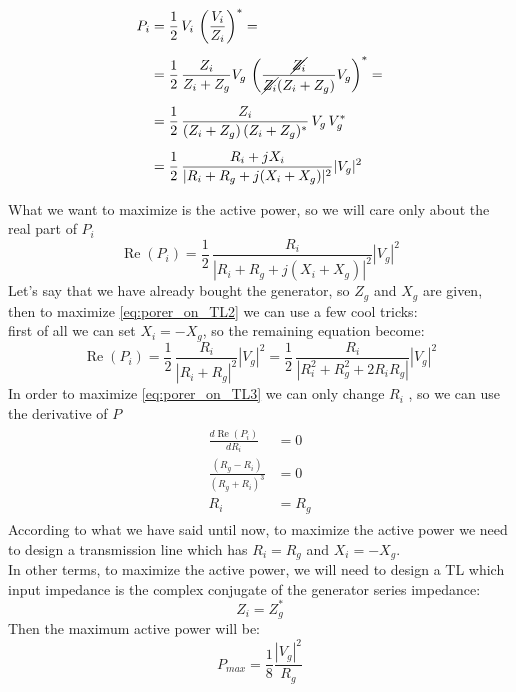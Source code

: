 \begin{align*}
    \begin{split}
        P_i&=\frac{1}{2}\,V_i\,\left(\frac{V_i}{Z_i}\right)^*=\\[5pt]
        &=\frac{1}{2}\,\frac{Z_i}{Z_i+Z_g}V_g\,\left(\frac{\cancel{Z_i}}{\cancel{Z_i}(Z_i+Z_g)}V_g\right)^*=\\[5pt]
        &=\frac{1}{2}\,\frac{Z_i}{(Z_i+Z_g)\,(Z_i+Z_g)^*}\,V_g\,V_g^*\\[5pt]
        &=\frac{1}{2}\,\frac{R_i+jX_i}{|R_i+R_g+j(X_i+X_g)|^2}|V_g|^2\\[5pt]
    \end{split}
\end{align*}
What we want to maximize is the active power, so we will care only about the real part of $P_i$
\begin{equation}
    \operatorname{Re}(P_i)=\frac{1}{2}\,\frac{R_i}{|R_i+R_g+j(X_i+X_g)|^2}|V_g|^2
\label{eq:porer_on_TL2}
\end{equation}
Let's say that we have already bought the generator, so $Z_g$ and $X_g$ are given, then to maximize \cref{eq:porer_on_TL2} we can use a few cool tricks:\\
first of all we can set $X_i=-X_g$, so the remaining equation become:
\begin{equation}
    \operatorname{Re}(P_i)=\frac{1}{2}\,\frac{R_i}{|R_i+R_g|^2}|V_g|^2=\frac{1}{2}\,\frac{R_i}{|R_i^2+R_g^2+2R_iR_g|}|V_g|^2
\label{eq:porer_on_TL3}
\end{equation}
In order to maximize \cref{eq:porer_on_TL3} we can only change $R_i$ , so we can use the derivative of $P$
\begin{align}
    \begin{split}
        \frac{d \operatorname{Re}(P_i)} {d R_i}&=0\\[5pt]
        \frac{(R_g - R_i)}{(R_g + R_i)^3}&=0\\[5pt]
        R_i&=R_g
    \end{split}
\end{align}
According to what we have said until now, to maximize the active power we need to design a transmission line which has $R_i=R_g$ and $X_i=-X_g$.\\
In other terms, to maximize the active power, we will need to design a TL which input impedance is the complex conjugate of the generator series impedance:
\begin{equation}
    Z_i=Z_g^*
\end{equation}
Then the maximum active power will be:
\begin{equation}
    P_{max}=\frac{1}{8}\frac{|V_g|^2}{R_g}
\end{equation}
